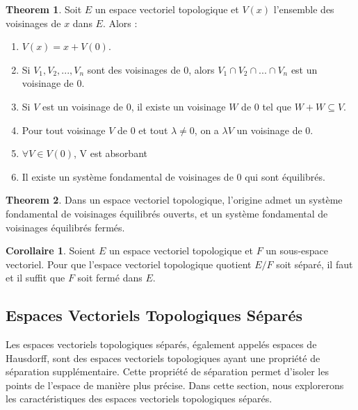 \documentclass{article}
\theoremstyle{definition}
\newtheorem{theorem}{Theorem}[section]
\newtheorem{corollary}{Corollaire}[section]
\theoremstyle{plain}
\begin{document}
\begin{theorem}
    Soit $E$ un espace vectoriel topologique et $V(x)$ l'ensemble des voisinages de $x$ dans $E$. Alors :

    \begin{enumerate}
        \item $V(x) = x + V(0)$.
        \item Si $V_1, V_2, ..., V_n$ sont des voisinages de $0$, alors $V_1 \cap V_2 \cap ... \cap V_n$ est un voisinage de $0$.
        \item Si $V$ est un voisinage de $0$, il existe un voisinage $W$ de $0$ tel que $W + W \subseteq V$.
        \item Pour tout voisinage $V$ de $0$ et tout $\lambda \neq 0$, on a $\lambda V$ un voisinage de 0.
        \item $\forall V \in V(0)$, V est absorbant
        \item Il existe un système fondamental de voisinages de $0$ qui sont équilibrés.
    \end{enumerate}

\end{theorem}

\begin{theorem}
    Dans un espace vectoriel topologique, 
    l'origine admet un système fondamental de voisinages équilibrés ouverts, et un système fondamental de voisinages équilibrés fermés.
\end{theorem}

\begin{corollary}
    Soient $E$ un espace vectoriel topologique et $F$ un sous-espace vectoriel. Pour que l'espace vectoriel topologique quotient $E/F$ soit séparé, il faut et il suffit que $F$ soit fermé dans $E$.
\end{corollary}



\subsection{Espaces Vectoriels Topologiques Séparés}

Les espaces vectoriels topologiques séparés, également appelés espaces de Hausdorff, sont des espaces vectoriels topologiques ayant une propriété de séparation supplémentaire. Cette propriété de séparation permet d'isoler les points de l'espace de manière plus précise. Dans cette section, nous explorerons les caractéristiques des espaces vectoriels topologiques séparés.
\end{document}
